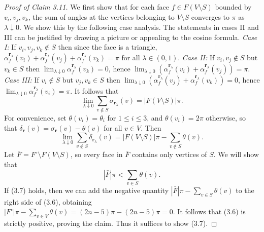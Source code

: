 \begin{proof}[Proof of Claim 3.11]
We first show that for each face $f\in F(V\setminus S)$ bounded by $v_i,v_j,v_k$, the sum of angles at the vertices belonging to $V\setminus S$ converges to $\pi$ as $\lambda\downarrow0$. We show this by the following case analysis. The statements in cases II and III can be justified by drawing a picture or appealing to the cosine formula.
\emph{Case I:} If $v_i,v_j,v_k\notin S$ then since the face is a triangle,
$\alpha_f^{\mathbf r_\lambda}(v_i)+\alpha_f^{\mathbf r_\lambda}(v_j)+\alpha_f^{\mathbf r_\lambda}(v_k)=\pi$ for all $\lambda\in(0,1)$.
\emph{Case II:} If $v_i,v_j\notin S$ but $v_k\in S$ then $\lim_{\lambda\downarrow0}\alpha_f^{\mathbf r_\lambda}(v_k)=0$, hence $\lim_{\lambda\downarrow0}(\alpha_f^{\mathbf r_\lambda}(v_i)+\alpha_f^{\mathbf r_\lambda}(v_j))=\pi$.
\emph{Case III:} If $v_i\notin S$ but $v_j,v_k\in S$ then $\lim_{\lambda\downarrow0}(\alpha_f^{\mathbf r_\lambda}(v_j)+\alpha_f^{\mathbf r_\lambda}(v_k))=0$, hence $\lim_{\lambda\downarrow0}\alpha_f^{\mathbf r_\lambda}(v_i)=\pi$.
It follows that
\[
\lim_{\lambda\downarrow0}\sum_{v\notin S}\sigma_{\mathbf r_\lambda}(v)=|F(V\setminus S)|\pi.\tag{3.5}
\]
For convenience, set $\theta(v_i)=\theta_i$ for $1\le i\le3$, and $\theta(v_i)=2\pi$ otherwise, so that $\delta_{\mathbf r}(v)=\sigma_{\mathbf r}(v)-\theta(v)$ for all $v\in V$. Then
\[
\lim_{\lambda\downarrow0}\sum_{v\notin S}\delta_{\mathbf r_\lambda}(v)
=|F(V\setminus S)|\pi-\sum_{v\notin S}\theta(v).\tag{3.6}
\]
Let $\bar F=F^\circ\setminus F(V\setminus S)$, so every face in $\bar F$ contains only vertices of $S$. We will show that
\[
|\bar F|\pi<\sum_{v\in S}\theta(v).\tag{3.7}
\]
If (3.7) holds, then we can add the negative quantity $|\bar F|\pi-\sum_{v\in S}\theta(v)$ to the right side of (3.6), obtaining $|F^\circ|\pi-\sum_{v\in V}\theta(v)=(2n-5)\pi-(2n-5)\pi=0$. It follows that (3.6) is strictly positive, proving the claim. Thus it suffices to show (3.7).


\end{proof}
